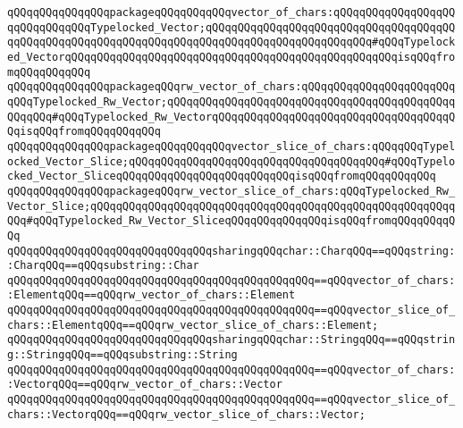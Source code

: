 \verb|qQQqqQQqqQQqqQQqpackageqQQqqQQqqQQqvector_of_chars:qQQqqQQqqQQqqQQqqQQqqQQqqQQqqQQqTypelocked_Vector;qQQqqQQqqQQqqQQqqQQqqQQqqQQqqQQqqQQqqQQqqQQqqQQqqQQqqQQqqQQqqQQqqQQqqQQqqQQqqQQqqQQqqQQqqQQqqQQq#qQQqTypelocked_VectorqQQqqQQqqQQqqQQqqQQqqQQqqQQqqQQqqQQqqQQqqQQqqQQqqQQqisqQQqfromqQQqqQQqqQQq|\newline
\verb|qQQqqQQqqQQqqQQqpackageqQQqrw_vector_of_chars:qQQqqQQqqQQqqQQqqQQqqQQqqQQqTypelocked_Rw_Vector;qQQqqQQqqQQqqQQqqQQqqQQqqQQqqQQqqQQqqQQqqQQqqQQqqQQq#qQQqTypelocked_Rw_VectorqQQqqQQqqQQqqQQqqQQqqQQqqQQqqQQqqQQqqQQqisqQQqfromqQQqqQQqqQQq|\newline
\verb|qQQqqQQqqQQqqQQqpackageqQQqqQQqqQQqvector_slice_of_chars:qQQqqQQqTypelocked_Vector_Slice;qQQqqQQqqQQqqQQqqQQqqQQqqQQqqQQqqQQqqQQq#qQQqTypelocked_Vector_SliceqQQqqQQqqQQqqQQqqQQqqQQqqQQqisqQQqfromqQQqqQQqqQQq|\newline
\verb|qQQqqQQqqQQqqQQqpackageqQQqrw_vector_slice_of_chars:qQQqTypelocked_Rw_Vector_Slice;qQQqqQQqqQQqqQQqqQQqqQQqqQQqqQQqqQQqqQQqqQQqqQQqqQQqqQQqqQQq#qQQqTypelocked_Rw_Vector_SliceqQQqqQQqqQQqqQQqisqQQqfromqQQqqQQqqQQq|\newline
\verb|qQQqqQQqqQQqqQQqqQQqqQQqqQQqqQQqsharingqQQqchar::CharqQQq==qQQqstring::CharqQQq==qQQqsubstring::Char|\newline
\verb|qQQqqQQqqQQqqQQqqQQqqQQqqQQqqQQqqQQqqQQqqQQqqQQq==qQQqvector_of_chars::ElementqQQq==qQQqrw_vector_of_chars::Element|\newline
\verb|qQQqqQQqqQQqqQQqqQQqqQQqqQQqqQQqqQQqqQQqqQQqqQQq==qQQqvector_slice_of_chars::ElementqQQq==qQQqrw_vector_slice_of_chars::Element;|\newline
\verb|qQQqqQQqqQQqqQQqqQQqqQQqqQQqqQQqsharingqQQqchar::StringqQQq==qQQqstring::StringqQQq==qQQqsubstring::String|\newline
\verb|qQQqqQQqqQQqqQQqqQQqqQQqqQQqqQQqqQQqqQQqqQQqqQQq==qQQqvector_of_chars::VectorqQQq==qQQqrw_vector_of_chars::Vector|\newline
\verb|qQQqqQQqqQQqqQQqqQQqqQQqqQQqqQQqqQQqqQQqqQQqqQQq==qQQqvector_slice_of_chars::VectorqQQq==qQQqrw_vector_slice_of_chars::Vector;|\newline
